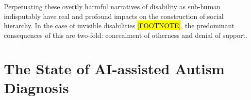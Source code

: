\documentclass[letterpaper]{article}
\begin{document}

Perpetuating these overtly harmful narratives of disability as sub-human indisputably have real and profound impacts on the construction of social hierarchy. In the case of invisible disabilities \hl{[FOOTNOTE]}, the predominant consequences of this are two-fold: concealment of otherness and denial of support.









\section{The State of AI-assisted Autism Diagnosis}
\end{document}
